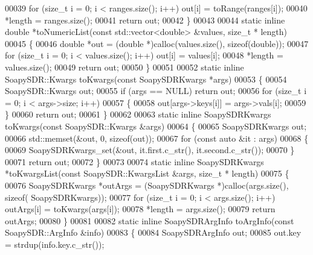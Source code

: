 \begin{DoxyCode}
00039     \textcolor{keywordflow}{for} (\textcolor{keywordtype}{size\_t} i = 0; i < ranges.size(); i++) out[i] = toRange(ranges[i]);
00040     *length = ranges.size();
00041     \textcolor{keywordflow}{return} out;
00042 \}
00043 
00044 \textcolor{keyword}{static} \textcolor{keyword}{inline} \textcolor{keywordtype}{double} *toNumericList(\textcolor{keyword}{const} std::vector<double> &values, \textcolor{keywordtype}{size\_t} *
      length)
00045 \{
00046     \textcolor{keywordtype}{double} *out = (\textcolor{keywordtype}{double} *)calloc(values.size(), \textcolor{keyword}{sizeof}(double));
00047     \textcolor{keywordflow}{for} (\textcolor{keywordtype}{size\_t} i = 0; i < values.size(); i++) out[i] = values[i];
00048     *length = values.size();
00049     \textcolor{keywordflow}{return} out;
00050 \}
00051 
00052 \textcolor{keyword}{static} \textcolor{keyword}{inline} SoapySDR::Kwargs toKwargs(\textcolor{keyword}{const} SoapySDRKwargs *args)
00053 \{
00054     SoapySDR::Kwargs out;
00055     \textcolor{keywordflow}{if} (args == NULL) \textcolor{keywordflow}{return} out;
00056     \textcolor{keywordflow}{for} (\textcolor{keywordtype}{size\_t} i = 0; i < args->size; i++)
00057     \{
00058         out[args->keys[i]] = args->vals[i];
00059     \}
00060     \textcolor{keywordflow}{return} out;
00061 \}
00062 
00063 \textcolor{keyword}{static} \textcolor{keyword}{inline} SoapySDRKwargs toKwargs(\textcolor{keyword}{const} SoapySDR::Kwargs &args)
00064 \{
00065     SoapySDRKwargs out;
00066     std::memset(&out, 0, \textcolor{keyword}{sizeof}(out));
00067     \textcolor{keywordflow}{for} (\textcolor{keyword}{const} \textcolor{keyword}{auto} &it : args)
00068     \{
00069         SoapySDRKwargs_set(&out, it.first.c\_str(), it.second.c\_str());
00070     \}
00071     \textcolor{keywordflow}{return} out;
00072 \}
00073 
00074 \textcolor{keyword}{static} \textcolor{keyword}{inline} SoapySDRKwargs *toKwargsList(\textcolor{keyword}{const} SoapySDR::KwargsList &args, \textcolor{keywordtype}{size\_t} *
      length)
00075 \{
00076     SoapySDRKwargs *outArgs = (SoapySDRKwargs *)calloc(args.size(), \textcolor{keyword}{sizeof}(
      SoapySDRKwargs));
00077     \textcolor{keywordflow}{for} (\textcolor{keywordtype}{size\_t} i = 0; i < args.size(); i++) outArgs[i] = toKwargs(args[i]);
00078     *length = args.size();
00079     \textcolor{keywordflow}{return} outArgs;
00080 \}
00081 
00082 \textcolor{keyword}{static} \textcolor{keyword}{inline} SoapySDRArgInfo toArgInfo(\textcolor{keyword}{const} SoapySDR::ArgInfo &info)
00083 \{
00084     SoapySDRArgInfo out;
00085     out.key = strdup(info.key.c\_str());

\end{DoxyCode}
